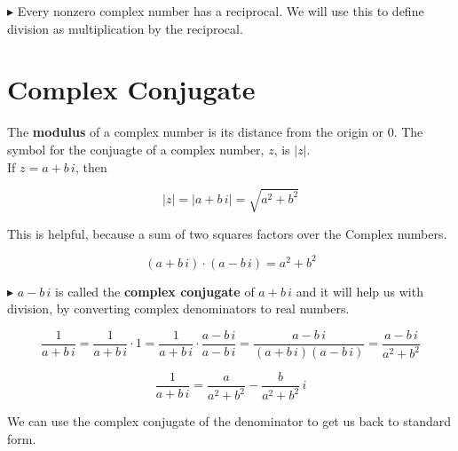 \documentclass{ximera}
\begin{document}
$\blacktriangleright$  Every nonzero complex number has a reciprocal.  We will use this to define division as multiplication by the reciprocal.





\section{Complex Conjugate}


The \textbf{modulus} of a complex number is its distance from the origin or $0$.  The symbol for the conjuagte of a complex number, $z$, is $|z|$.  \\

If $z = a + b \, i$, then

\[    |z| = |a + b \, i| = \sqrt{a^2 + b^2}          \]



This is helpful, because a sum of two squares factors over the Complex numbers.



\[   (a + b \, i) \cdot    (a - b \, i)  = a^2 + b^2   \]



$\blacktriangleright$  $a - b \, i$ is called the \textbf{complex conjugate} of $a + b \, i$ and it will help us with division, by converting complex denominators to real numbers.




\[   \frac{1}{a + b \, i} =   \frac{1}{a + b \, i} \cdot 1 = \frac{1}{a + b \, i} \cdot \frac{a - b \, i}{a - b \, i}  =  \frac{a - b \, i}{(a + b \, i)(a - b \, i)} =   \frac{a - b \, i}{a^2 + b^2}  \]


\[  \frac{1}{a + b \, i}   =  \frac{a}{a^2 + b^2} - \frac{b}{a^2 + b^2} \, i      \]


We can use the complex conjugate of the denominator to get us back to standard form.
\end{document}
